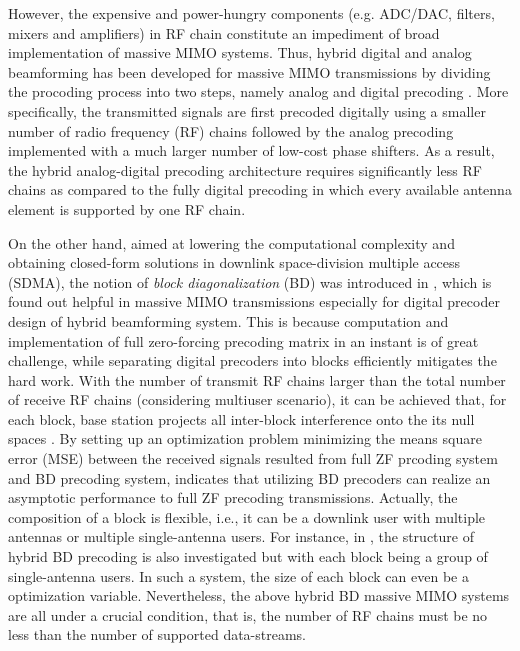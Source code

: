 \documentclass[conference]{IEEEtran}
\begin{document}
However, the expensive and power-hungry components (e.g. ADC/DAC, filters, mixers and amplifiers) in RF chain constitute an impediment of broad implementation of massive MIMO systems.  Thus, hybrid digital and analog beamforming has been developed for massive MIMO transmissions by dividing the procoding process into two steps, namely analog and digital precoding \cite{han2015large, el2014spatially}. More specifically, the transmitted signals are first precoded digitally using a smaller number of radio frequency (RF) chains followed by the analog precoding implemented with a much larger number of low-cost phase shifters. As a result, the hybrid analog-digital precoding architecture requires significantly less RF chains as compared to the fully digital precoding in which every available antenna element is supported by one RF chain. 

On the other hand, aimed at lowering the computational complexity and obtaining closed-form solutions in downlink space-division multiple access (SDMA), the notion of \textit{block diagonalization} (BD) was introduced in \cite{spencer2004zero}, which is found out helpful in massive MIMO transmissions especially for digital precoder design of hybrid beamforming system. This is because computation and implementation of full zero-forcing precoding matrix in an instant is of great challenge, while separating digital precoders into blocks efficiently mitigates the hard work. With the number of transmit RF chains larger than the total number of receive RF chains (considering multiuser scenario), it can be achieved that, for each block, base station projects all inter-block interference onto the its null spaces \cite{ni2016hybrid}. By setting up an optimization problem minimizing the means square error (MSE) between the received signals resulted from full ZF prcoding system and BD precoding system, \cite{bogale2014beamforming} indicates that utilizing BD precoders can realize an asymptotic performance to full ZF precoding transmissions. Actually, the composition of a block is flexible, i.e., it can be a downlink user with multiple antennas or multiple single-antenna users. For instance, in \cite{liu2014phase}, the structure of hybrid BD precoding is also investigated but with each block being a group of single-antenna users. In such a system, the size of each block can even be a optimization variable. Nevertheless, the above hybrid BD massive MIMO systems are all under a crucial condition, that is, the number of RF chains must be no less than the number of supported data-streams.
\end{document}
